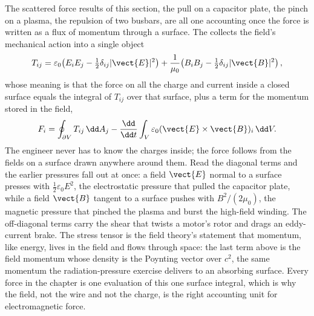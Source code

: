 \begin{mastery}
The scattered force results of this section, the pull on a capacitor plate,
the pinch on a plasma, the repulsion of two busbars, are all one accounting
once the force is written as a flux of momentum through a surface. The
 collects the field's mechanical action into
a single object
\[
T_{ij} = \varepsilon_0\!\left(E_i E_j - \tfrac12\delta_{ij}|\vect{E}|^{2}
\right) + \frac{1}{\mu_0}\!\left(B_i B_j - \tfrac12\delta_{ij}|\vect{B}|^{2}
\right),
\]
whose meaning is that the force on all the charge and current inside a
closed surface equals the integral of $T_{ij}$ over that surface, plus a
term for the momentum stored in the field,
\[
F_i = \oint_{\partial V} T_{ij}\,\dd A_j - \frac{\dd}{\dd t}\int_V
\varepsilon_0(\vect{E}\times\vect{B})_i\,\dd V.
\]
The engineer never has to know the charges inside; the force follows from
the fields on a surface drawn anywhere around them. Read the diagonal terms
and the earlier pressures fall out at once: a field $\vect{E}$ normal to a
surface presses with $\tfrac12\varepsilon_0 E^{2}$, the electrostatic
pressure that pulled the capacitor plate, while a field $\vect{B}$ tangent
to a surface pushes with $B^{2}/(2\mu_0)$, the magnetic pressure that
pinched the plasma and burst the high-field winding. The off-diagonal terms
carry the shear that twists a motor's rotor and drags an eddy-current
brake. The stress tensor is the field theory's statement that momentum, like
energy, lives in the field and flows through space: the last term above is
the field momentum whose density is the Poynting vector over $c^{2}$, the
same momentum the radiation-pressure exercise delivers to an absorbing
surface. Every force in the chapter is one evaluation of this one surface
integral, which is why the field, not the wire and not the charge, is the
right accounting unit for electromagnetic force.
\end{mastery}

